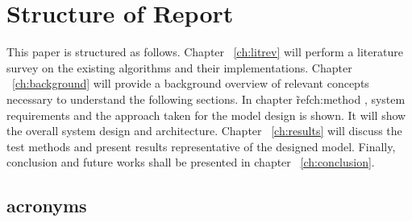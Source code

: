 %
%


\section{Structure of Report}
This paper is structured as follows. Chapter ~\ref{ch:litrev} will perform a
literature survey on the existing algorithms and their implementations. Chapter
~\ref{ch:background}  will provide a background overview of relevant concepts
necessary to understand the following sections. In chapter  \~ref{ch:method },
system requirements and the approach taken for the model design is shown. It
will show the overall system design and architecture.  Chapter
~\ref{ch:results} will discuss the test methods and present results
representative of the designed model. Finally, conclusion and future works
shall be presented in chapter ~\ref{ch:conclusion}. 

\subsection{acronyms}


